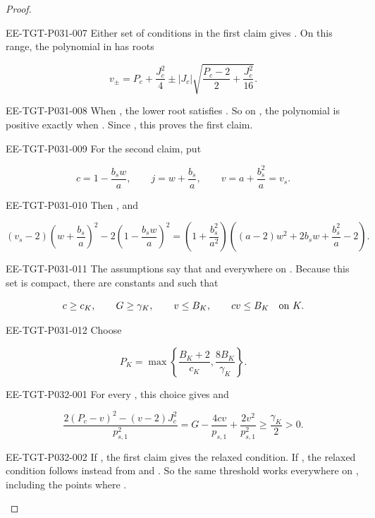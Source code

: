 \begin{proof}
\begin{EESegment}{EE-TGT-P031-007}
Either set of conditions in the first claim gives
. On this range, the polynomial
 in
 has roots
\end{EESegment}
\[
  v_{\pm}=P_c+\frac{J_c^2}{4}\pm |J_c|\sqrt{\frac{P_c-2}{2}+\frac{J_c^2}{16}}.
\]
\begin{EESegment}{EE-TGT-P031-008}
When , the lower root satisfies
. So on
, the polynomial is positive exactly when
. Since
, this proves the first claim.
\end{EESegment}

\begin{EESegment}{EE-TGT-P031-009}
For the second claim, put
\end{EESegment}
\[
  c=1-\frac{b_sw}{a},\qquad j=w+\frac{b_s}{a},\qquad v=a+\frac{b_s^2}{a}=v_s.
\]
\begin{EESegment}{EE-TGT-P031-010}
Then , and
\end{EESegment}
\[
  (v_s-2)\left(w+\frac{b_s}{a}\right)^2-2\left(1-\frac{b_sw}{a}\right)^2
  =\left(1+\frac{b_s^2}{a^2}\right)\left((a-2)w^2+2b_sw+\frac{b_s^2}{a}-2\right).
\]
\begin{EESegment}{EE-TGT-P031-011}
The assumptions say that  and
 everywhere on
. Because this set is compact, there are constants
 and
 such that
\end{EESegment}
\[
  c\geq c_K,\qquad G\geq\gamma_K,\qquad v\leq B_K,\qquad cv\leq B_K\quad\hbox{on }K.
\]
\begin{EESegment}{EE-TGT-P031-012}
Choose
\end{EESegment}
\[
  P_K=\max\left\{\frac{B_K+2}{c_K},\frac{8B_K}{\gamma_K}\right\}.
\]
%
\begin{EESegment}{EE-TGT-P032-001}
For every , this choice gives
 and
\end{EESegment}
\[
  \frac{2(P_c-v)^2-(v-2)J_c^2}{p_{s,1}^2}
  =G-\frac{4cv}{p_{s,1}}+\frac{2v^2}{p_{s,1}^2}
  \geq\frac{\gamma_K}{2}>0.
\]
\begin{EESegment}{EE-TGT-P032-002}
If , the first claim gives the relaxed condition.
If , the relaxed condition follows instead from
 and
. So the same threshold works
everywhere on , including the points where
.
\end{EESegment}
\end{proof}

